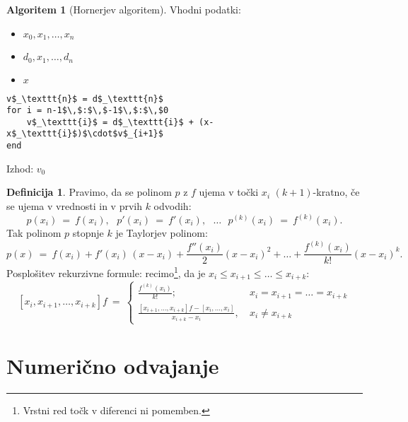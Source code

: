 \documentclass[11pt]{article}
\theoremstyle{definition}
\newtheorem{definicija}{Definicija}[section]
\theoremstyle{definition}
\newtheorem*{algoritem}{Algoritem}
\begin{document}
\pagebreak
\begin{algoritem}[Hornerjev algoritem]

Vhodni podatki: 
\begin{itemize}
	\item $x_0, x_1, \ldots, x_n$
	\item $d_0, x_1, \ldots, d_n$
	\item $x$
\end{itemize}
\begin{lstlisting}
v$_\texttt{n}$ = d$_\texttt{n}$
for i = n-1$\,$:$\,$-1$\,$:$\,$0
    v$_\texttt{i}$ = d$_\texttt{i}$ + (x-x$_\texttt{i}$)$\cdot$v$_{i+1}$
end
\end{lstlisting}
Izhod: $v_0$

\end{algoritem}
\vspace{0.5cm}

\begin{definicija}

Pravimo, da se polinom $p$ z $f$ ujema v točki $x_i$ \hbox{$(k+1)$-kratno}, če se ujema v vrednosti in v prvih $k$ odvodih:
$$p(x_i) ~=~ f(x_i), ~~~p'(x_i) ~=~ f'(x_i), ~~~\ldots~~~ p^{(k)}(x_i) ~=~ f^{(k)}(x_i).$$
Tak polinom $p$ stopnje $k$ je Taylorjev polinom:
$$p(x) ~=~ f(x_i) + f'(x_i)\,(x-x_i) + \frac{f''(x_i)}{2}(x-x_i)^2 + \ldots + \frac{f^{(k)}(x_i)}{k!}(x-x_i)^k.$$
Posplošitev rekurzivne formule: recimo\footnote{Vrstni red točk v diferenci ni pomemben.}, da je $x_i \leq x_{i+1} \leq \ldots \leq x_{i+k}$:
$$[x_i, x_{i+1}, \ldots, x_{i+k}]f ~=~ \begin{cases}
\frac{f^{(k)}(x_i)}{k!}; ~&x_i = x_{i+1} = \ldots = x_{i+k} \\
\frac{[x_{i+1}, \ldots, x_{i+k}]f - [x_i, \ldots, x_{i}]}{x_{i+k} - x_i}, ~&x_i \neq x_{i+k}
\end{cases}$$

\end{definicija}
\vspace{0.5cm}


\pagebreak


\section{Numerično odvajanje}
\vspace{0.5cm}
\end{document}
